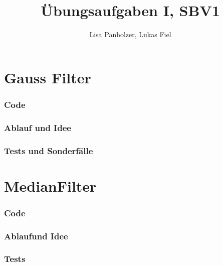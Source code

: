\documentclass[12pt,german]{article}
\begin{document}
\title{Übungsaufgaben I, SBV1 }
\author{Lisa Panholzer, Lukas Fiel}
\maketitle
\newpage
\section{Gauss Filter}
\subsubsection{Code}


\subsubsection{Ablauf und Idee}

\subsubsection{Tests und Sonderfälle}



\newpage
\section{MedianFilter }
\subsubsection{Code}

\subsubsection{Ablaufund Idee}

\subsubsection{Tests}


\newpage
\end{document}

